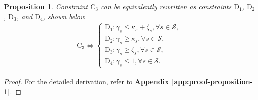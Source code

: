 \documentclass[10pt,a4paper]{amsart}
\newtheorem{proposition}{Proposition}
\begin{document}
\begin{proposition} \label{thm:proposition-1}
	Constraint $ \mathrm{C}_{3} $ can be equivalently rewritten as constraints $ \mathrm{D}_{1} $, $ \mathrm{D}_{2} $, $ \mathrm{D}_{3} $, and $ \mathrm{D}_{4} $, shown below
	\begin{align} \nonumber
		\mathrm{C}_{3} \Leftrightarrow
			\begin{cases}
				   	\mathrm{D}_{1}: \gamma_s \leq \kappa_s + \zeta_s, \forall s \in \mathcal{S}, 
				   	\\	
				   	\mathrm{D}_{2}: \gamma_s \geq \kappa_s, \forall s \in \mathcal{S},   
				   	\\	
				   	\mathrm{D}_{3}: \gamma_s \geq \zeta_s, \forall s \in \mathcal{S},
				   	\\	
				   	\mathrm{D}_{4}: \gamma_s \leq 1, \forall s \in \mathcal{S}. 
			\end{cases}
	\end{align}
\end{proposition} 

\begin{proof} 
	For the detailed derivation, refer to \textbf{Appendix \ref{app:proof-proposition-1}}.
\end{proof}
\end{document}
